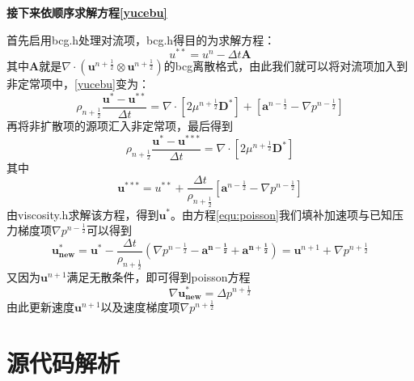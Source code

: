 \documentclass[lang=cn,11pt,a4paper]{elegantpaper}
\begin{document}
\textbf{接下来依顺序求解方程\ref{yucebu}}\par
首先启用bcg.h处理对流项，bcg.h得目的为求解方程：
\begin{equation}\label{equ:duiliu}
    u^{**}=u^n-\Delta t \mathbf{A}
\end{equation}
其中$\mathbf{A}$就是$\nabla\cdot(\mathbf{u}^{n+\frac{1}{2}}\otimes\mathbf{u}^{n+\frac{1}{2}})$的bcg离散格式，由此我们就可以将对流项加入到非定常项中，\ref{yucebu}变为：
\begin{equation}\label{equ:vis}
    \rho_{n+\frac{1}{2}}\frac{\mathbf{u}^* - \mathbf{u}^{**}}{\Delta t}= \nabla \cdot [2\mu^{n+\frac{1}{2}}\mathbf{D^*}]+[\mathbf{a}^{n-\frac{1}{2}}-\nabla p^{n-\frac{1}{2}}]
\end{equation}
再将非扩散项的源项汇入非定常项，最后得到
\begin{equation}\label{equ:kuosan}
    \rho_{n+\frac{1}{2}}\frac{\mathbf{u}^* - \mathbf{u}^{***}}{\Delta t}= \nabla \cdot [2\mu^{n+\frac{1}{2}}\mathbf{D^*}]
\end{equation}
其中
\begin{equation}\label{equ:yuanxiangjiazai}
    \mathbf{u}^{***} = u^{**}+\frac{\Delta t}{\rho_{n+\frac{1}{2}}}[\mathbf{a}^{n-\frac{1}{2}}-\nabla p^{n-\frac{1}{2}}]
\end{equation}
由viscosity.h求解该方程，得到$\mathbf{u^*}$。由方程\ref{equ:poisson}我们填补加速项与已知压力梯度项$\nabla p^{n-\frac{1}{2}}$可以得到
\begin{equation}\label{equ:sudugengxin}
    \mathbf{u^*_{new}}=\mathbf{u^*}-\frac{\Delta t}{\rho_{n+\frac{1}{2}}}(\nabla p^{n-\frac{1}{2}}-\mathbf{a^{n-\frac{1}{2}}}+\mathbf{a^{n+\frac{1}{2}}}) = \mathbf{u}^{n+1} + \nabla p^{n+ \frac{1}{2}}
\end{equation}
又因为$\mathbf{u}^{n+1}$满足无散条件，即可得到poisson方程
\begin{equation}
     \nabla\mathbf{u^*_{new}}=\Delta p^{n+\frac{1}{2}}
\end{equation}
由此更新速度$\mathbf{u}^{n+1}$以及速度梯度项$\nabla p^{n+\frac{1}{2}}$
\section{源代码解析}
\end{document}
